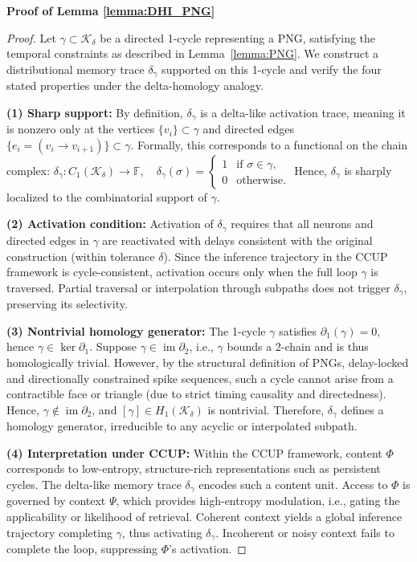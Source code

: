 \documentclass[lettersize,journal]{IEEEtran}
\begin{document}
\noindent\textbf{Proof of Lemma \ref{lemma:DHI_PNG}}

\begin{proof}
Let \( \gamma \subset \mathcal{K}_\delta \) be a directed 1-cycle representing a PNG, satisfying the temporal constraints as described in Lemma~\ref{lemma:PNG}. We construct a distributional memory trace \( \delta_\gamma \) supported on this 1-cycle and verify the four stated properties under the delta-homology analogy.

\textbf{(1) Sharp support:}  
By definition, \( \delta_\gamma \) is a delta-like activation trace, meaning it is nonzero only at the vertices \( \{v_i\} \subset \gamma \) and directed edges \( \{e_i = (v_i \to v_{i+1})\} \subset \gamma \). Formally, this corresponds to a functional on the chain complex:
$\delta_\gamma : C_1(\mathcal{K}_\delta) \to \mathbb{F}, \quad \delta_\gamma(\sigma) =
\begin{cases}
1 & \text{if } \sigma \in \gamma, \\
0 & \text{otherwise}.
\end{cases}$
Hence, \( \delta_\gamma \) is sharply localized to the combinatorial support of \( \gamma \).

\textbf{(2) Activation condition:}  
Activation of \( \delta_\gamma \) requires that all neurons and directed edges in \( \gamma \) are reactivated with delays consistent with the original construction (within tolerance \( \delta \)). Since the inference trajectory in the CCUP framework is cycle-consistent, activation occurs only when the full loop \( \gamma \) is traversed. Partial traversal or interpolation through subpaths does not trigger \( \delta_\gamma \), preserving its selectivity.

\textbf{(3) Nontrivial homology generator:}  
The 1-cycle \( \gamma \) satisfies \( \partial_1(\gamma) = 0 \), hence \( \gamma \in \ker \partial_1 \). Suppose \( \gamma \in \operatorname{im} \partial_2 \), i.e., \( \gamma \) bounds a 2-chain and is thus homologically trivial. However, by the structural definition of PNGs, delay-locked and directionally constrained spike sequences, such a cycle cannot arise from a contractible face or triangle (due to strict timing causality and directedness). Hence, \( \gamma \notin \operatorname{im} \partial_2 \), and \( [\gamma] \in H_1(\mathcal{K}_\delta) \) is nontrivial. Therefore, \( \delta_\gamma \) defines a homology generator, irreducible to any acyclic or interpolated subpath.

\textbf{(4) Interpretation under CCUP:}  
Within the CCUP framework, content \( \Phi \) corresponds to low-entropy, structure-rich representations such as persistent cycles. The delta-like memory trace \( \delta_\gamma \) encodes such a content unit. Access to \( \Phi \) is governed by context \( \Psi \), which provides high-entropy modulation, i.e., gating the applicability or likelihood of retrieval. Coherent context yields a global inference trajectory completing \( \gamma \), thus activating \( \delta_\gamma \). Incoherent or noisy context fails to complete the loop, suppressing \( \Phi \)'s activation.


\end{proof}
\end{document}
